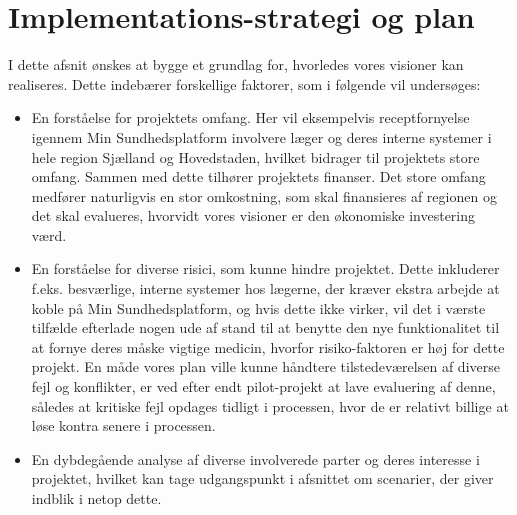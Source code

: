 \section{Implementations-strategi og plan}
I dette afsnit ønskes at bygge et grundlag for, hvorledes vores visioner kan realiseres.
Dette indebærer forskellige faktorer, som i følgende vil undersøges:
\begin{itemize}
  \item En forståelse for projektets omfang. Her vil eksempelvis receptfornyelse igennem Min Sundhedsplatform involvere læger og deres interne systemer i hele region Sjælland og Hovedstaden, hvilket bidrager til projektets store omfang. Sammen med dette tilhører projektets finanser. Det store omfang medfører naturligvis en stor omkostning, som skal finansieres af regionen og det skal evalueres, hvorvidt vores visioner er den økonomiske investering værd. 
  \item En forståelse for diverse risici, som kunne hindre projektet. Dette inkluderer f.eks. besværlige, interne systemer hos lægerne, der kræver ekstra arbejde at koble på Min Sundhedsplatform, og hvis dette ikke virker, vil det i værste tilfælde efterlade nogen ude af stand til at benytte den nye funktionalitet til at fornye deres måske vigtige medicin, hvorfor risiko-faktoren er høj for dette projekt. 
  En måde vores plan ville kunne håndtere tilstedeværelsen af diverse fejl og konflikter, er ved efter endt pilot-projekt at lave evaluering af denne, således at kritiske fejl opdages tidligt i processen, hvor de er relativt billige at løse kontra senere i processen.  
  \item En dybdegående analyse af diverse involverede parter og deres interesse i projektet, hvilket kan tage udgangspunkt i afsnittet om scenarier, der giver indblik i netop dette. 
\end{itemize}

